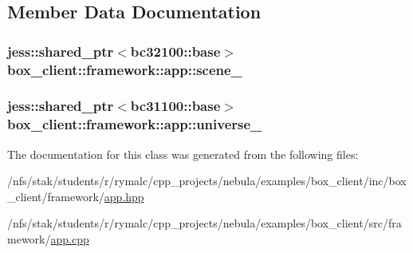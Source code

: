 \subsection{Member Data Documentation}
\hypertarget{classbox__client_1_1framework_1_1app_af24e1862739f2bd6aad3cf124e1aa28c}{
\subsubsection[{scene\_\-}]{\setlength{\rightskip}{0pt plus 5cm}jess::shared\_\-ptr$<${\bf bc32100::base}$>$ {\bf box\_\-client::framework::app::scene\_\-}}}
\label{classbox__client_1_1framework_1_1app_af24e1862739f2bd6aad3cf124e1aa28c}
\hypertarget{classbox__client_1_1framework_1_1app_ac5df1e5bfccb6417ec23b67e0dbc23c2}{
\subsubsection[{universe\_\-}]{\setlength{\rightskip}{0pt plus 5cm}jess::shared\_\-ptr$<${\bf bc31100::base}$>$ {\bf box\_\-client::framework::app::universe\_\-}}}
\label{classbox__client_1_1framework_1_1app_ac5df1e5bfccb6417ec23b67e0dbc23c2}


The documentation for this class was generated from the following files:\begin{DoxyCompactItemize}
\item 
/nfs/stak/students/r/rymalc/cpp\_\-projects/nebula/examples/box\_\-client/inc/box\_\-client/framework/\hyperlink{examples_2box__client_2inc_2box__client_2framework_2app_8hpp}{app.hpp}\item 
/nfs/stak/students/r/rymalc/cpp\_\-projects/nebula/examples/box\_\-client/src/framework/\hyperlink{examples_2box__client_2src_2framework_2app_8cpp}{app.cpp}\end{DoxyCompactItemize}
